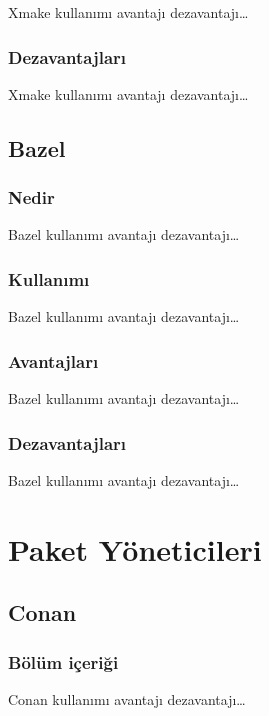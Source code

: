 \documentclass[
]{book}
\begin{document}
Xmake kullanımı avantajı dezavantajı\ldots{}

\hypertarget{dezavantajlarux131-8}{%
\section*{Dezavantajları}\label{dezavantajlarux131-8}}

Xmake kullanımı avantajı dezavantajı\ldots{}

\hypertarget{bazel}{%
\chapter*{Bazel}\label{bazel}}

\hypertarget{nedir-9}{%
\section*{Nedir}\label{nedir-9}}

Bazel kullanımı avantajı dezavantajı\ldots{}

\hypertarget{kullanux131mux131-9}{%
\section*{Kullanımı}\label{kullanux131mux131-9}}

Bazel kullanımı avantajı dezavantajı\ldots{}

\hypertarget{avantajlarux131-9}{%
\section*{Avantajları}\label{avantajlarux131-9}}

Bazel kullanımı avantajı dezavantajı\ldots{}

\hypertarget{dezavantajlarux131-9}{%
\section*{Dezavantajları}\label{dezavantajlarux131-9}}

Bazel kullanımı avantajı dezavantajı\ldots{}

\hypertarget{part-paket-yuxf6neticileri}{%
\part{Paket Yöneticileri}\label{part-paket-yuxf6neticileri}}

\hypertarget{conan}{%
\chapter*{Conan}\label{conan}}

\hypertarget{buxf6luxfcm-iuxe7eriux11fi-1}{%
\section*{Bölüm içeriği}\label{buxf6luxfcm-iuxe7eriux11fi-1}}

Conan kullanımı avantajı dezavantajı\ldots{}
\end{document}
